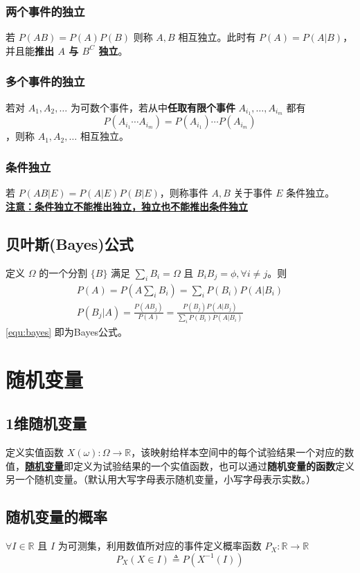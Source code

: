 \documentclass[./main.tex]{subfiles}
\begin{document}
\subsubsection{两个事件的独立}
若 $P(AB)=P(A)P(B)$ 则称 $A,B$ 相互独立。此时有 $P(A)=P(A|B)$，并且能\textbf{推出 $A$ 与 $B^C$ 独立}。
\subsubsection{多个事件的独立}
若对 $A_1,A_2,\dots$ 为可数个事件，若从中\textbf{任取有限个事件} $A_{i_1},\dots,A_{i_m}$ 都有 $$P(A_{i_1}\cdots A_{i_m})=P(A_{i_1})\cdots P(A_{i_m})$$，则称 $A_1,A_2,\dots$ 相互独立。
\subsubsection{条件独立}
若 $P(AB|E)=P(A|E)P(B|E)$，则称事件 $A,B$ 关于事件 $E$ 条件独立。\\
\indent \underline{\textbf{注意：条件独立不能推出独立，独立也不能推出条件独立}}
\subsection{贝叶斯(Bayes)公式}
定义 $\Omega$ 的一个分割 $\{B\}$ 满足 $\sum_i B_i=\Omega$ 且 $B_iB_j=\phi,\forall i\neq j$。则
\begin{gather}
    P(A)=P(A\sum_iB_i)=\sum_iP(B_i)P(A|B_i)\\
    P(B_j|A)=\frac{P(AB_j)}{P(A)}=\frac{P(B_j)P(A|B_j)}{\sum_iP(B_i)P(A|B_i)}\label{equ:bayes}
\end{gather}
\eqref{equ:bayes} 即为Bayes公式。
\section{随机变量}
\subsection{1维随机变量}
定义实值函数 $X(\omega):\Omega\rightarrow\mathbb{R}$，该映射给样本空间中的每个试验结果一个对应的数值，\underline{\textbf{随机变量}}即定义为试验结果的一个实值函数，也可以通过\textbf{随机变量的函数}定义另一个随机变量。{\kaishu（默认用大写字母表示随机变量，小写字母表示实数。）}
\subsection{随机变量的概率}
$\forall I\in\mathbb{R}$ 且 $I$ 为可测集，利用数值所对应的事件定义概率函数 $P_X:\mathbb{R}\rightarrow\mathbb{R}$
$$P_X(X\in I)\triangleq P(X^{-1}(I))$$
\end{document}
